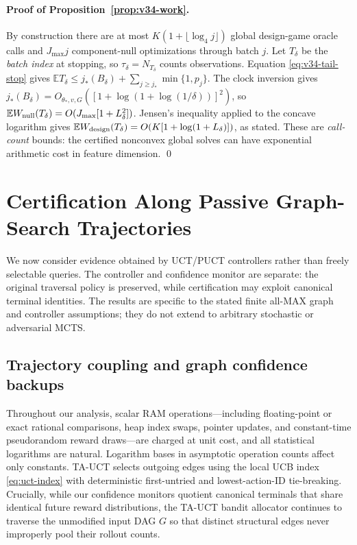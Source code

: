 \documentclass{article}
\theoremstyle{plain}
\theoremstyle{definition}
\begin{document}
\paragraph{Proof of Proposition~\ref{prop:v34-work}.}
By construction there are at most
$K(1+\lfloor\log_4 j\rfloor)$ global design-game oracle calls and
$J_{\max}j$ component-null optimizations through batch $j$.
Let $T_\delta$ be the \emph{batch index} at stopping, so
$\tau_\delta=N_{T_\delta}$ counts observations. Equation
\eqref{eq:v34-tail-stop} gives
$\mathbb E T_\delta\le j_*(B_\delta)+
\sum_{j\ge j_*}\min\{1,p_j\}$.
The clock inversion gives
$j_*(B_\delta)=O_{\theta_*,v,G}(
[1+\log(1+\log(1/\delta))]^2)$,
so $\mathbb E W_{\rm null}(T_\delta)=
O(J_{\max}[1+L_\delta^2])$.
Jensen's inequality applied to the concave logarithm gives
$\mathbb E W_{\rm design}(T_\delta)
=O(K[1+\log(1+L_\delta)])$, as stated.
These are \emph{call-count} bounds: the certified nonconvex global
solves can have exponential arithmetic cost in feature dimension.
\qed

\clearpage

\section{Certification Along Passive Graph-Search Trajectories}
\label{app:group-passive}

We now consider evidence obtained by UCT/PUCT controllers rather than freely selectable queries. The controller and confidence monitor are separate: the original traversal policy is preserved, while certification may exploit canonical terminal identities. The results are specific to the stated finite all-MAX graph and controller assumptions; they do not extend to arbitrary stochastic or adversarial MCTS.

\subsection{Trajectory coupling and graph confidence backups}
\label{app:ta-proofs}
\label{app:backup-proof}

Throughout our analysis, scalar RAM operations—including floating-point or exact rational comparisons, heap index swaps, pointer updates, and constant-time pseudorandom reward draws—are charged at unit cost, and all statistical logarithms are natural. Logarithm bases in
asymptotic operation counts affect only constants. TA-UCT selects outgoing edges using the local UCB index \eqref{eq:uct-index} with deterministic first-untried and lowest-action-ID tie-breaking. Crucially, while our confidence monitors quotient canonical terminals that share identical future reward distributions, the TA-UCT bandit allocator continues to traverse the unmodified input DAG $G$ so that distinct structural edges never improperly pool their rollout counts.
\end{document}
